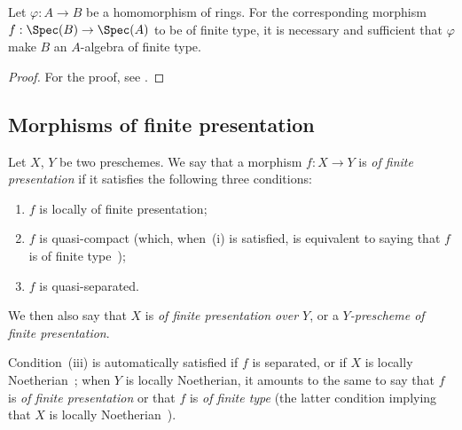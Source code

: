 \begin{proposition}[1.5.7]
\label{IV.1.5.7}
Let $\varphi:A\to B$ be a homomorphism of rings.
For the corresponding morphism $f:\Spec(B)\to\Spec(A)$ to be of finite type, it is necessary and sufficient that $\varphi$ make $B$ an $A$-algebra of finite type.
\end{proposition}

\begin{proof}
For the proof, see .
\end{proof}

\subsection{Morphisms of finite presentation}
\label{subsection:IV.1.6}

\begin{definition}[1.6.1]
\label{IV.1.6.1}
Let $X$, $Y$ be two preschemes.
We say that a morphism $f:X\to Y$ is \emph{of finite presentation} if it satisfies the following three conditions:
\begin{enumerate}
  \item[\rm(i)] $f$ is locally of finite presentation;
  \item[\rm(ii)] $f$ is quasi-compact (which, when~(i) is satisfied, is equivalent to saying that $f$ is of finite type~);
  \item[\rm(iii)] $f$ is quasi-separated.
\end{enumerate}
We then also say that $X$ is \emph{of finite presentation over $Y$}, or a \emph{$Y$-prescheme of finite presentation}.
\end{definition}

Condition~(iii) is automatically satisfied if $f$ is separated, or if $X$ is locally Noetherian~; when $Y$ is locally Noetherian, it amounts to the same to say that $f$ is \emph{of finite presentation} or that $f$ is \emph{of finite type} (the latter condition implying that $X$ is locally Noetherian~).

